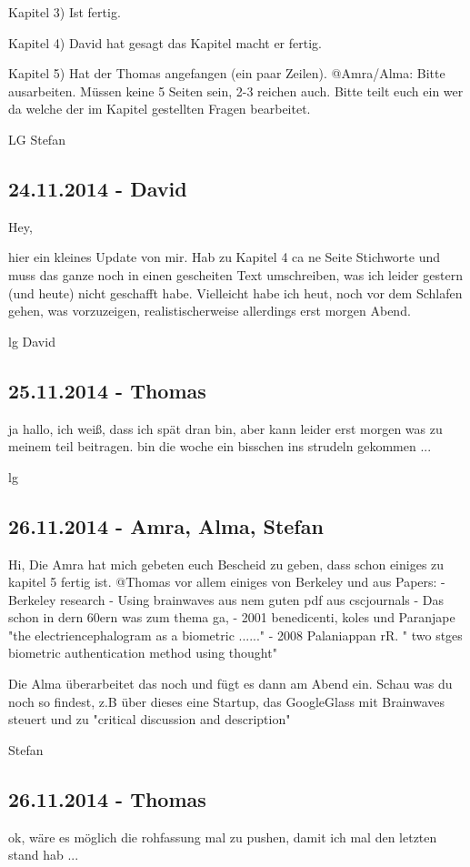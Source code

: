 \documentclass[a4paper,11pt]{article}
\begin{document}
Kapitel 3)
Ist fertig. 

Kapitel 4) 
David hat gesagt das Kapitel macht er fertig.

Kapitel 5)
Hat der Thomas angefangen (ein paar Zeilen).
@Amra/Alma: Bitte ausarbeiten. Müssen keine 5 Seiten sein, 2-3 reichen auch. Bitte teilt euch ein wer da welche der im Kapitel gestellten Fragen bearbeitet.

LG Stefan

\subsection{24.11.2014 - David}
Hey,

hier ein kleines Update von mir. Hab zu Kapitel 4 ca ne Seite Stichworte und muss das ganze noch in einen gescheiten Text umschreiben, was ich leider gestern (und heute) nicht geschafft habe. Vielleicht habe ich heut, noch vor dem Schlafen gehen, was vorzuzeigen, realistischerweise allerdings erst morgen Abend.

lg David

\subsection{25.11.2014 - Thomas}
ja hallo,
ich weiß, dass ich spät dran bin, aber kann leider erst morgen was zu meinem teil beitragen. bin die woche ein bisschen ins strudeln gekommen ...
 
lg

\subsection{26.11.2014 - Amra, Alma, Stefan}
Hi,
Die Amra hat mich gebeten euch Bescheid zu geben, dass schon einiges zu kapitel 5 fertig ist.
@Thomas vor allem einiges von Berkeley und aus Papers:
- Berkeley research 
- Using brainwaves aus nem guten pdf aus cscjournals
- Das schon in dern 60ern was zum thema ga, 
- 2001 benedicenti, koles und Paranjape "the electriencephalogram as a biometric ......"
- 2008 Palaniappan rR. " two stges biometric authentication method using thought"

Die Alma überarbeitet das noch und fügt es dann am Abend ein. Schau was du noch so findest, z.B über dieses eine Startup, das GoogleGlass mit Brainwaves steuert und zu "critical discussion and description"

Stefan

\subsection{26.11.2014 - Thomas}
ok, wäre es möglich die rohfassung mal zu pushen, damit ich mal den letzten stand hab ...
\end{document}
